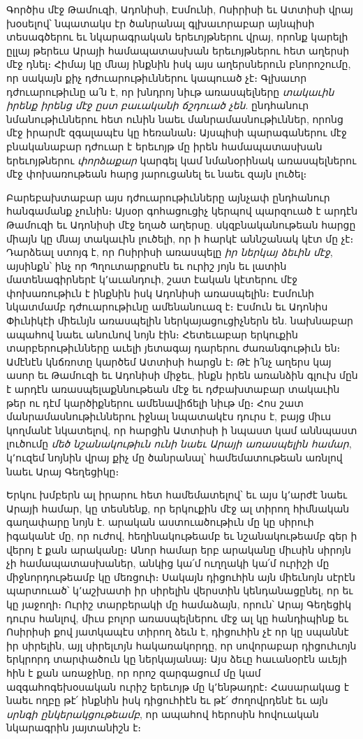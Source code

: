 \documentclass{article}
\begin{document}
{Գործիս մէջ Թամուզի, Ադոնիսի, Էսմունի, Ոսիրիսի եւ Ատտիսի վրայ խօսելով՝ նպատակս էր ծանրանալ գլխաւորաբար այնպիսի տեսագծերու եւ նկարագրական երեւոյթներու վրայ, որոնք կարելի ըլլայ թերեւս Արայի համապատասխան երեւոյթներու հետ աղերսի մէջ դնել։ Հիմայ կը մնայ ինքնին իսկ այս աղերսներուն բնորոշումը, որ սակայն քիչ դժուարութիւններու կապուած չէ։ Գլխաւոր դժուարութիւնը ա՛ն է, որ խնդրոյ նիւթ առասպելները \emph{տակաւին իրենք իրենց մէջ ըստ բաւականի ճշդուած չեն}. ընդհանուր նմանութիւններու հետ ունին նաեւ մանրամասնութիւններ, որոնց մէջ իրարմէ զգալապէս կը հեռանան։ Այսպիսի պարագաներու մէջ բնականաբար դժուար է երեւոյթ մը իրեն համապատասխան երեւոյթներու \emph{փորձաքար} կարգել կամ նմանօրինակ առասպելներու մէջ փոխառութեան հարց յարուցանել եւ նաեւ զայն լուծել։

Բարեբախտաբար այս դժուարութիւնները այնչափ ընդհանուր հանգամանք չունին։ Այսօր գոհացուցիչ կերպով պարզուած է արդէն Թամուզի եւ Ադոնիսի մէջ եղած աղերսը. սկզբնականութեան հարցը միայն կը մնայ տակաւին լուծելի, որ ի հարկէ աննշանակ կէտ մը չէ։ Դարձեալ ստոյգ է, որ Ոսիրիսի առասպելը \emph{իր ներկայ ձեւին մէջ}, այսինքն՝ ինչ որ Պղուտարքոսէն եւ ուրիշ յոյն եւ լատին մատենագիրներէ կ՚աւանդուի, շատ էական կէտերու մէջ փոխառութիւն է ինքնին իսկ Ադոնիսի առասպելին։ Էսմունի նկատմամբ դժուարութիւնը ամենանուազ է։ Էսմուն եւ Ադոնիս Փիւնիկէի միեւնյն առասպելին ներկայացուցիչներն են. նախնաբար ապահով նաեւ անունով նոյն էին։ Հետեւաբար երկուքին տարբերութիւնները աւելի յետագայ դարերու ժառանգութիւն են։ Ամէնէն կնճռոտը կարծեմ Ատտիսի հարցն է։ Թէ ի՛նչ աղերս կայ ասոր եւ Թամուզի եւ Ադոնիսի միջեւ, ինքն իրեն առանձին գլուխ մըն է արդէն առասպելաքննութեան մէջ եւ դժբախտաբար տակաւին թեր ու դէմ կարծիքներու ամենավիճելի նիւթ մը։ Հոս շատ մանրամասնութիւններու իջնալ նպատակէս դուրս է, բայց միւս կողմանէ նկատելով, որ հարցին Ատտիսի ի նպաստ կամ աննպաստ լուծումը \emph{մեծ նշանակութիւն ունի նաեւ Արայի առասպելին համար}, կ՚ուզեմ նոյնին վրայ քիչ մը ծանրանալ՝ համեմատութեան առնլով նաեւ Արայ Գեղեցիկը։

Երկու խմբերն ալ իրարու հետ համեմատելով՝ եւ այս կ՚արժէ նաեւ Արայի համար, կը տեսնենք, որ երկուքին մէջ ալ տիրող հիմնական գաղափարը նոյն է. արական աստուածութիւն մը կը սիրուի իգականէ մը, որ ուժով, հեղինակութեամբ եւ նշանակութեամբ գեր ի վերոյ է քան արականը։ Անոր համար երբ արականը միւսին սիրոյն չի համապատասխաներ, անկից կա՛մ ուղղակի կա՛մ ուրիշի մը միջնորդութեամբ կը մեռցուի։ Սակայն դիցուհին այն միեւնոյն սէրէն պարտուած՝ կ՚աշխատի իր սիրելին վերստին կենդանացընել, որ եւ կը յաջողի։ Ուրիշ տարբերակի մը համաձայն, որուն՝ Արայ Գեղեցիկ դուրս հանլով, միւս բոլոր առասպելներու մէջ ալ կը հանդիպինք եւ Ոսիրիսի քով յատկապէս տիրող ձեւն է, դիցուհին չէ որ կը սպաննէ իր սիրելին, այլ սիրելւոյն հակառակորդը, որ սովորաբար դիցուհւոյն երկրորդ տարփածուն կը ներկայանայ։ Այս ձեւը հաւանօրէն աւեյի հին է քան առաջինը, որ որոշ զարգացում մը կամ ազգահոգեխօսական ուրիշ երեւոյթ մը կ՚ենթադրէ։ Հասարակաց է նաեւ ողբը թէ՛ ինքնին իսկ դիցուհիէն եւ թէ՛ ժողովրդենէ եւ այն \emph{սրնգի ընկերակցութեամբ}, որ ապահով հերոսին հովուական նկարագրին յայտանիշն է։

}
\end{document}
